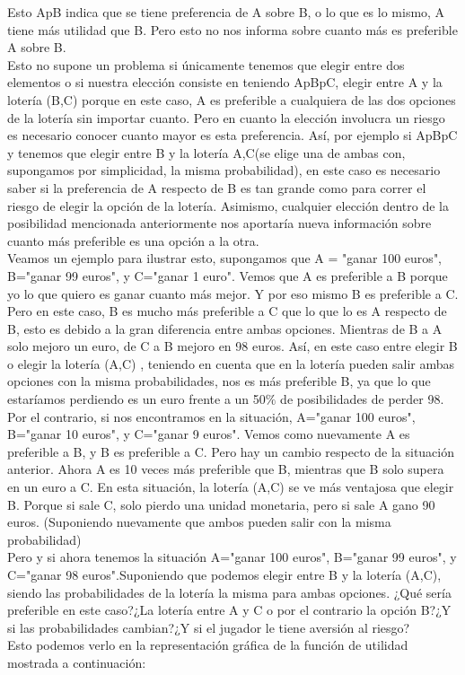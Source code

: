 \documentclass[10pt,a4paper]{book}
\begin{document}
Esto ApB indica que se tiene preferencia de A sobre B, o lo que es lo mismo, A tiene más utilidad que B. Pero esto no nos informa sobre cuanto más es preferible A sobre B. \\
Esto no supone un problema si únicamente tenemos que elegir entre dos elementos o si nuestra elección consiste en teniendo ApBpC, elegir entre A y la lotería (B,C) porque en este caso, A es preferible a cualquiera de las dos opciones de la lotería sin importar cuanto. Pero en cuanto la elección involucra un riesgo es necesario conocer cuanto mayor es esta preferencia. Así, por ejemplo si ApBpC y tenemos que elegir entre B y la lotería {A,C}(se elige una de ambas con, supongamos por simplicidad, la misma probabilidad), en este caso es necesario saber si la preferencia de A respecto de B es tan grande como para correr el riesgo de elegir la opción de la lotería.  Asimismo, cualquier elección dentro de la posibilidad mencionada anteriormente nos aportaría nueva información sobre cuanto más preferible es una opción a la otra.\\

Veamos un ejemplo para ilustrar esto, supongamos que A = "ganar 100 euros", B="ganar 99 euros", y C="ganar 1 euro". Vemos que A es preferible a B porque yo lo que quiero es ganar cuanto más mejor. Y por eso mismo B es preferible a C. Pero en este caso, B es mucho más preferible a C que lo que lo es A respecto de B, esto es debido a la gran diferencia entre ambas opciones. Mientras de B a A solo mejoro un euro, de C a B mejoro en 98 euros. Así, en este caso entre elegir B o elegir la lotería (A,C) , teniendo en cuenta que en la lotería pueden salir ambas opciones con la misma probabilidades, nos es más preferible B, ya que lo que estaríamos perdiendo es un euro frente a un 50$\%$ de posibilidades de perder 98. \\
Por el contrario, si nos encontramos en la situación, A="ganar 100 euros", B="ganar 10 euros", y C="ganar 9 euros". Vemos como nuevamente A es preferible a B, y B es preferible a C. Pero hay un cambio respecto de la situación anterior. Ahora A es 10 veces más preferible que B, mientras que B solo supera en un euro a C. En esta situación, la lotería (A,C) se ve más ventajosa que elegir B. Porque si sale C, solo pierdo una unidad monetaria, pero si sale A gano 90 euros. (Suponiendo nuevamente que ambos pueden salir con la misma probabilidad)\\
Pero y si ahora tenemos la situación A="ganar 100 euros", B="ganar 99 euros", y C="ganar 98 euros".Suponiendo que podemos elegir entre B y la lotería (A,C), siendo las probabilidades de la lotería la misma para ambas opciones. ¿Qué sería preferible en este caso?¿La lotería entre A y C o por el contrario la opción B?¿Y si las probabilidades cambian?¿Y si el jugador le tiene aversión al riesgo?\\
Esto podemos verlo en la representación gráfica de la función de utilidad mostrada a continuación:\\
\end{document}
